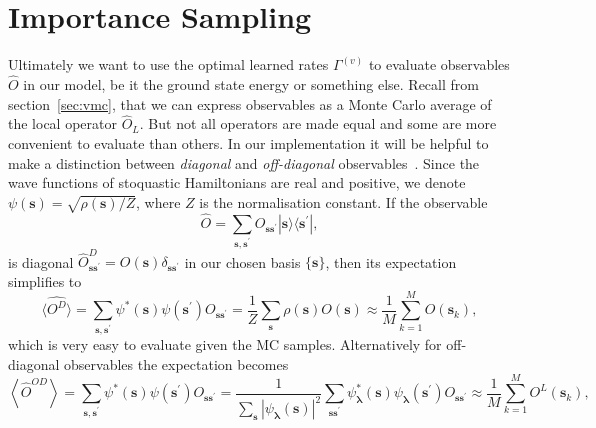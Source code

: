 \section{Importance Sampling}
\label{sec:Impl-MCIP}
Ultimately we want to use the optimal learned rates $\Gamma^{(v)}$ to evaluate observables $\hat O$ in our model, be it the ground state energy or something else. Recall from section~\ref{sec:vmc}, that we can express observables as a Monte Carlo average of the local operator $\hat O_L$. But not all operators are made equal and some are more convenient to evaluate than others. In our implementation it will be helpful to make a distinction between \emph{diagonal} and \emph{off-diagonal} observables~\cite{torlai2018neural}. Since the wave functions of stoquastic Hamiltonians are real and positive, we denote $\psi(\boldsymbol{s}) = \sqrt{\rho(\boldsymbol{s})/Z}$, where $Z$ is the normalisation constant. If the observable
\begin{equation}
	\hat {O}=\sum_{\boldsymbol{s}, \boldsymbol{s}^{\prime}} {O}_{\boldsymbol{s} \boldsymbol{s}^{\prime}}|\boldsymbol{s}\rangle \langle \boldsymbol{s}^{\prime}|,
\end{equation}
is diagonal $\hat{O}_{\boldsymbol{s} \boldsymbol{s}^{\prime}}^{D}={O}(\boldsymbol{s}) \delta_{\boldsymbol{s} \boldsymbol{s}^{\prime}}$ in our chosen basis $\{\boldsymbol{s}\}$, then its expectation simplifies to 
\begin{equation}
	\langle\hat{O^D}\rangle=\sum_{\boldsymbol{s}, \boldsymbol{s}^{\prime}} \psi^*(\boldsymbol{s}) \psi(\boldsymbol{s}^{\prime}) {O}_{\boldsymbol{s} \boldsymbol{s}^{\prime}} = \frac{1}{Z} \sum_{\boldsymbol{s}} \rho(\boldsymbol{s}) O({\boldsymbol{s}})  \approx \frac{1}{M} \sum_{k=1}^{M} O(\boldsymbol{s}_{k}),
\end{equation}
which is very easy to evaluate given the MC samples. Alternatively for off-diagonal observables the expectation becomes
\begin{equation}
	\left\langle\hat{O}^{OD}\right\rangle=\sum_{\boldsymbol{s}, \boldsymbol{s}^{\prime}} \psi^{*}(\boldsymbol{s}) \psi(\boldsymbol{s}^{\prime}) O_{\boldsymbol{s} \boldsymbol{s}^{\prime}} = \frac{1}{\sum_{\boldsymbol{s}}\left|\psi_{\boldsymbol{\lambda}}(\boldsymbol{s})\right|^{2}} \sum_{\boldsymbol{s} \boldsymbol{s}^{\prime}} \psi_{\boldsymbol{\lambda}}^{*}(\boldsymbol{s}) \psi_{\boldsymbol{\lambda}}(\boldsymbol{s}^{\prime}) O_{\boldsymbol{s} \boldsymbol{s}^{\prime}} \approx \frac{1}{M} \sum_{k=1}^{M} O^L(\boldsymbol{s}_{k}),
\end{equation}
